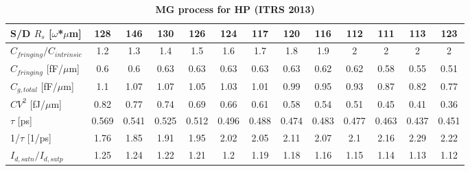 \documentclass[a4paper, 12pt, twoside, openright]{report}
\begin{document}
\begin{table}[h]
{\begin{tabular}{||l||c|c|c|c|c|c|c|c|c|c|c|c||}
\hline
S/D $R_{s}$ [$\omega$*$\mu$m]&128&146&130&126&124&117&120&116&112&111&113&123\\
\hline
$C_{fringing}/C_{intrinsic}$ &1.2&1.3&1.4&1.5&1.6&1.7&1.8&1.9&2&2&2&2\\
\hline
$C_{fringing}$ [fF/$\mu$m]&0.6&0.6&0.63&0.63&0.63&0.63&0.63&0.62&0.62&0.58&0.55&0.51\\
\hline
$C_{g,total}$ [fF/$\mu$m]&1.1&1.07&1.07&1.05&1.03&1.01&0.99&0.95&0.93&0.87&0.82&0.77\\
\hline
$CV^{2}$ [fJ/$\mu$m]&0.82&0.77&0.74&0.69&0.66&0.61&0.58&0.54&0.51&0.45&0.41&0.36\\
\hline
$\tau$ [ps]&0.569&0.541&0.525&0.512&0.496&0.488&0.474&0.483&0.477&0.463&0.437&0.451\\
\hline
1/$\tau$ [1/ps]&1.76&1.85&1.91&1.95&2.02&2.05&2.11&2.07&2.1&2.16&2.29&2.22\\
\hline
$I_{d,satn}/I_{d,satp}$&1.25&1.24&1.22&1.21&1.2&1.19&1.18&1.16&1.15&1.14&1.13&1.12\\
\hline
\end{tabular}}
\caption{\textbf{MG process for HP (ITRS 2013)}}
\end{table}
\end{document}
